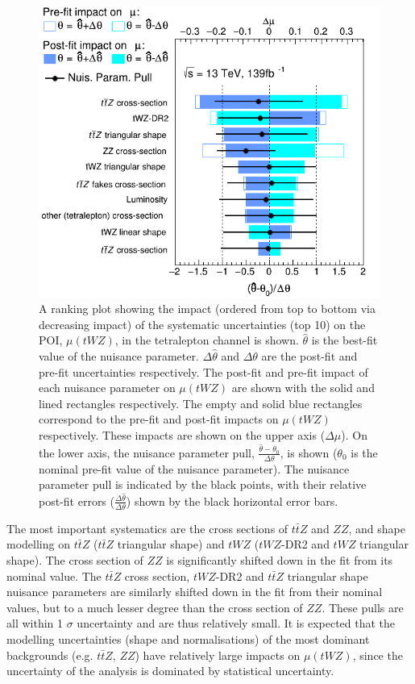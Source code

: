\begin{figure}[h!]
\centering
    \includegraphics[width=.65\textwidth]{figures/PostFitPlots/RankingSysts_SigXsecOverSM_systs}
    \caption{A ranking plot showing the impact (ordered from top to bottom via decreasing impact) of the systematic uncertainties (top 10) on the POI, $\mu (tWZ)$, in the tetralepton channel is shown. $\hat{\theta}$ is the best-fit value of the nuisance parameter. $\Delta \hat{\theta}$ and $\Delta\theta$ are the post-fit and pre-fit uncertainties respectively. The post-fit and pre-fit impact of each nuisance parameter on $\mu (tWZ)$ are shown with the solid and lined rectangles respectively. The empty and solid blue rectangles correspond to the pre-fit and post-fit impacts on $\mu (tWZ)$ respectively. These impacts are shown on the upper axis ($\Delta \mu$). On the lower axis, the nuisance parameter pull, $\frac{\hat{\theta} - \theta_{0}}{\Delta{\theta}}$, is shown ($\theta_{0}$ is the nominal pre-fit value of the nuisance parameter). The nuisance parameter pull is indicated by the black points, with their relative post-fit errors ($\frac{\Delta \hat{\theta}}{\Delta \theta}$) shown by the black horizontal error bars. }
  \label{fig:4lep-PostFit-nuisance-ranking}
\end{figure}

The most important systematics are the cross sections of $t\bar{t}Z$ and $ZZ$, and shape modelling on $t\bar{t}Z$ ($t\bar{t}Z$ triangular shape) and $tWZ$ ($tWZ$-DR2 and $tWZ$ triangular shape). The cross section of $ZZ$ is significantly shifted down in the fit from its nominal value. The $t\bar{t}Z$ cross section, $tWZ$-DR2 and $t\bar{t}Z$ triangular shape nuisance parameters are similarly shifted down in the fit from their nominal values, but to a much lesser degree than the cross section of $ZZ$. These pulls are all within 1 $\sigma$ uncertainty and are thus relatively small. It is expected that the modelling uncertainties (shape and normalisations) of the most dominant backgrounds (e.g. $t\bar{t}Z$, $ZZ$) have relatively large impacts on $\mu(tWZ)$, since the uncertainty of the analysis is dominated by statistical uncertainty.

